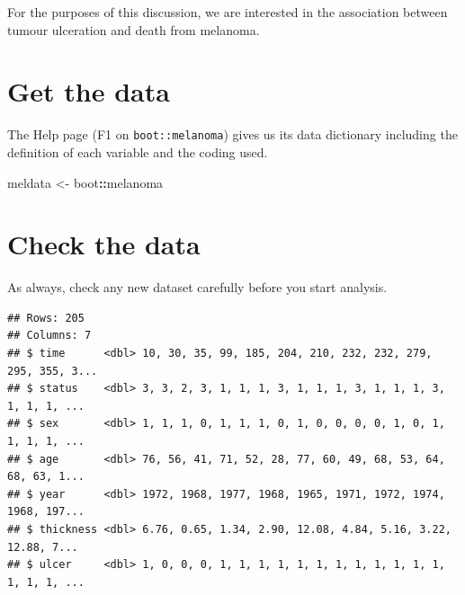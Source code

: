 \documentclass[
  12pt,
  krantz2]{krantz}
\makeatletter
\newenvironment{Shaded}{\begin{snugshade}}{\end{snugshade}}
\newcommand{\KeywordTok}[1]{\textcolor[rgb]{0.13,0.29,0.53}{\textbf{#1}}}
\newcommand{\NormalTok}[1]{#1}
\newcommand{\OperatorTok}[1]{\textcolor[rgb]{0.81,0.36,0.00}{\textbf{#1}}}
\newcommand{\StringTok}[1]{\textcolor[rgb]{0.31,0.60,0.02}{#1}}
\newenvironment{kframe}{%
\medskip{}
\setlength{\fboxsep}{.8em}
 \def\at@end@of@kframe{}%
 \ifinner\ifhmode%
  \def\at@end@of@kframe{\end{minipage}}%
  \begin{minipage}{\columnwidth}%
 \fi\fi%
 \def\FrameCommand##1{\hskip\@totalleftmargin \hskip-\fboxsep
 \colorbox{shadecolor}{##1}\hskip-\fboxsep
     \hskip-\linewidth \hskip-\@totalleftmargin \hskip\columnwidth}%
 \MakeFramed {\advance\hsize-\width
   \@totalleftmargin\z@ \linewidth\hsize
   \@setminipage}}%
 {\par\unskip\endMakeFramed%
 \at@end@of@kframe}
\renewenvironment{Shaded}{\begin{kframe}}{\end{kframe}}
\makeatother
\begin{document}
For the purposes of this discussion, we are interested in the association between tumour ulceration and death from melanoma.

\hypertarget{get-the-data-4}{%
\section{Get the data}\label{get-the-data-4}}

The Help page (F1 on \texttt{boot::melanoma}) gives us its data dictionary including the definition of each variable and the coding used.

\begin{Shaded}
\begin{Highlighting}[]
\NormalTok{meldata <-}\StringTok{ }\NormalTok{boot}\OperatorTok{::}\NormalTok{melanoma}
\end{Highlighting}
\end{Shaded}

\hypertarget{check-the-data-2}{%
\section{Check the data}\label{check-the-data-2}}

As always, check any new dataset carefully before you start analysis.

\begin{Shaded}
\end{Shaded}

\begin{verbatim}
## Rows: 205
## Columns: 7
## $ time      <dbl> 10, 30, 35, 99, 185, 204, 210, 232, 232, 279, 295, 355, 3...
## $ status    <dbl> 3, 3, 2, 3, 1, 1, 1, 3, 1, 1, 1, 3, 1, 1, 1, 3, 1, 1, 1, ...
## $ sex       <dbl> 1, 1, 1, 0, 1, 1, 1, 0, 1, 0, 0, 0, 0, 1, 0, 1, 1, 1, 1, ...
## $ age       <dbl> 76, 56, 41, 71, 52, 28, 77, 60, 49, 68, 53, 64, 68, 63, 1...
## $ year      <dbl> 1972, 1968, 1977, 1968, 1965, 1971, 1972, 1974, 1968, 197...
## $ thickness <dbl> 6.76, 0.65, 1.34, 2.90, 12.08, 4.84, 5.16, 3.22, 12.88, 7...
## $ ulcer     <dbl> 1, 0, 0, 0, 1, 1, 1, 1, 1, 1, 1, 1, 1, 1, 1, 1, 1, 1, 1, ...
\end{verbatim}
\end{document}
